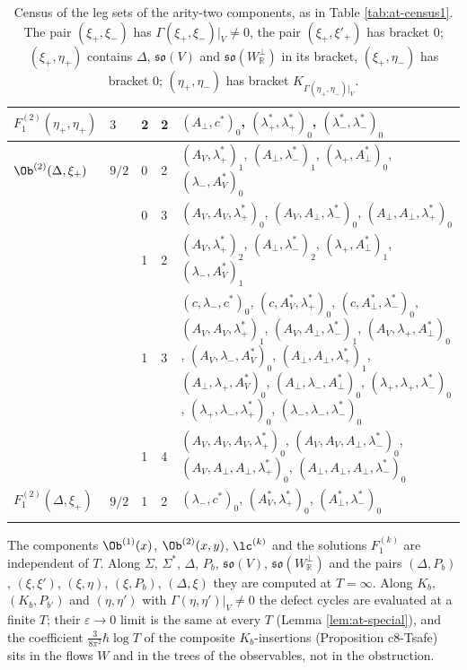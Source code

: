 {\begin{longtable}{>{\raggedright}p{2.3cm}|p{0.6cm}|p{0.25cm}|p{0.25cm}|>{\raggedright\arraybackslash}p{11.6cm}}
\hline
$F_1^{(2)}(\eta_+,\eta_+)$ & $3$ & 2 & 2 & $(A_\perp,c^*)_{0}$, $(\lambda^*_+,\lambda^*_+)_{0}$, $(\lambda^*_-,\lambda^*_-)_{0}$ \\
\hline
$\Ob^{(2)}(\Delta,\xi_+)$ & $9/2$ & 0 & 2 & $(A_V,\lambda^*_+)_{1}$, $(A_\perp,\lambda^*_-)_{1}$, $(\lambda_+,A^*_\perp)_{0}$, $(\lambda_-,A^*_V)_{0}$ \\
 &  & 0 & 3 & $(A_V,A_V,\lambda^*_+)_{0}$, $(A_V,A_\perp,\lambda^*_-)_{0}$, $(A_\perp,A_\perp,\lambda^*_+)_{0}$ \\
 &  & 1 & 2 & $(A_V,\lambda^*_+)_{2}$, $(A_\perp,\lambda^*_-)_{2}$, $(\lambda_+,A^*_\perp)_{1}$, $(\lambda_-,A^*_V)_{1}$ \\
 &  & 1 & 3 & $(c,\lambda_-,c^*)_{0}$, $(c,A^*_V,\lambda^*_+)_{0}$, $(c,A^*_\perp,\lambda^*_-)_{0}$, $(A_V,A_V,\lambda^*_+)_{1}$, $(A_V,A_\perp,\lambda^*_-)_{1}$, $(A_V,\lambda_+,A^*_\perp)_{0}$, $(A_V,\lambda_-,A^*_V)_{0}$, $(A_\perp,A_\perp,\lambda^*_+)_{1}$, $(A_\perp,\lambda_+,A^*_V)_{0}$, $(A_\perp,\lambda_-,A^*_\perp)_{0}$, $(\lambda_+,\lambda_+,\lambda^*_-)_{0}$, $(\lambda_+,\lambda_-,\lambda^*_+)_{0}$, $(\lambda_-,\lambda_-,\lambda^*_-)_{0}$ \\
 &  & 1 & 4 & $(A_V,A_V,A_V,\lambda^*_+)_{0}$, $(A_V,A_V,A_\perp,\lambda^*_-)_{0}$, $(A_V,A_\perp,A_\perp,\lambda^*_+)_{0}$, $(A_\perp,A_\perp,A_\perp,\lambda^*_-)_{0}$ \\
\hline
$F_1^{(2)}(\Delta,\xi_+)$ & $9/2$ & 1 & 2 & $(\lambda_-,c^*)_{0}$, $(A^*_V,\lambda^*_+)_{0}$, $(A^*_\perp,\lambda^*_-)_{0}$ \\
\hline

\caption{Census of the leg sets of the arity-two components, as in Table \ref{tab:at-census1}. The pair $(\xi_+,\xi_-)$ has $\Gamma(\xi_+,\xi_-)|_V\neq0$, the pair $(\xi_+,\xi'_+)$ has bracket $0$; $(\xi_+,\eta_+)$ contains $\Delta$, $\mathfrak{so}(V)$ and $\mathfrak{so}(W^\perp_{\mathbb R})$ in its bracket, $(\xi_+,\eta_-)$ has bracket $0$; $(\eta_+,\eta_-)$ has bracket $K_{\Gamma(\eta_+,\eta_-)|_V}$.}
\label{tab:at-census2}
\end{longtable}
}

\begin{proposition}[Endpoint]
\label{prop:at-T}
The components $\Ob^{(1)}(x)$, $\Ob^{(2)}(x,y)$, $\lc^{(k)}$ and the solutions $F_1^{(k)}$ are independent of $T$. Along $\Sigma$, $\Sigma^*$, $\Delta$, $P_b$, $\mathfrak{so}(V)$, $\mathfrak{so}(W^\perp_{\mathbb R})$ and the pairs $(\Delta,P_b)$, $(\xi,\xi')$, $(\xi,\eta)$, $(\xi,P_b)$, $(\Delta,\xi)$ they are computed at $T=\infty$. Along $K_b$, $(K_b,P_{b'})$ and $(\eta,\eta')$ with $\Gamma(\eta,\eta')|_V\neq0$ the defect cycles are evaluated at a finite $T$; their $\varepsilon\to0$ limit is the same at every $T$ (Lemma \ref{lem:at-special}), and the coefficient $\tfrac3{8\pi^2}\hbar\log T$ of the composite $K_b$-insertions (Proposition c8-Tsafe) sits in the flows $W$ and in the trees of the observables, not in the obstruction.
\end{proposition}

